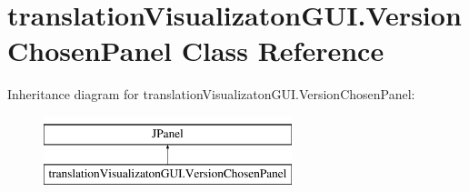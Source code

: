 \hypertarget{classtranslation_visualizaton_g_u_i_1_1_version_chosen_panel}{}\section{translation\+Visualizaton\+G\+U\+I.\+Version\+Chosen\+Panel Class Reference}
\label{classtranslation_visualizaton_g_u_i_1_1_version_chosen_panel}
Inheritance diagram for translation\+Visualizaton\+G\+U\+I.\+Version\+Chosen\+Panel\+:\begin{figure}[H]
\begin{center}
\leavevmode
\includegraphics[height=2.000000cm]{classtranslation_visualizaton_g_u_i_1_1_version_chosen_panel}
\end{center}
\end{figure}
